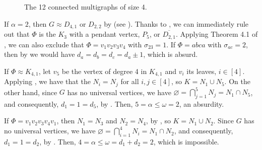 \documentclass[11pt]{article}
\newtheorem{theorem}{Theorem}[section]
\begin{document}
\begin{figure}[h]
	\caption{The 12 connected multigraphs of size 4.}
	\label{Phi.posibles.deg=4}
\end{figure}
If $\alpha=2$, then $G\approx D_{4,1}$ or $D_{2,2}$ by  (see ). Thanks to , we can immediately rule out that $\Phi$ is the $K_3$ with a pendant vertex, $P_5$, or $\overline{D_{2,1}}$. 
Applying Theorem 4.1 of \cite{schvollner2026induced}, we can also exclude that $\Phi = v_1v_2v_3v_4$ with $\sigma_{23} = 1$. If $\Phi = abca$ with $\sigma_{ac} = 2$, then by   we would have $d_a = d_b = d_c = d_a \pm 1$, which is absurd.

If $\Phi \approx K_{4,1}$, let $v_5$ be the vertex of degree 4 in $K_{4,1}$ and $v_i$ its leaves, $i \in [4]$. Applying , we have that the $N_i=N_j$ for all $i,j\in [4]$, so $K = N_1 \cup N_5$. On the other hand, since $G$ has no universal vertices, we have $\varnothing = \bigcap_{j=1}^5 N_j = N_1 \cap N_5$, and consequently, $d_1 = 1 = d_5$, by  . Then, $5 = \alpha \leq \omega = 2$, an absurdity.

If $\Phi = v_1v_2v_3v_4v_1$, then $N_1 = N_3$ and $N_2 = N_4$, by , so $K = N_1 \cup N_2$. Since $G$ has no universal vertices, we have $\varnothing = \bigcap_{i=1}^4 N_i = N_1 \cap N_2$, and consequently, $d_1 = 1 = d_2$, by  . Then, $4 = \alpha \leq \omega = d_1 + d_2 = 2$, which is impossible.
\end{document}

